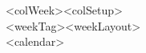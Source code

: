 {\renewcommand{\arraystretch}{\myNumArrayStretch}\setlength{\tabcolsep}{\myLenTabColSep}%
\begin{tabular}[t]{<colWeek><colSetup>}
     \\ \hline
    <weekTag><weekLayout> \\ \hline
<calendar>
\end{tabular}}